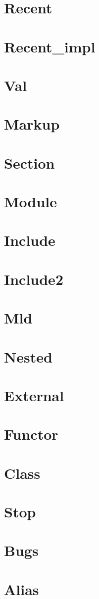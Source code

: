\documentclass{book}
\newcommand{\inputchapter}[1]{\chapter{#1}
    }
\begin{document}
\inputchapter{Recent}
\inputchapter{Recent_impl}
\inputchapter{Val}
\inputchapter{Markup}
\inputchapter{Section}
\inputchapter{Module}
\inputchapter{Include}
\inputchapter{Include2}
\inputchapter{Mld}
\inputchapter{Nested}
\inputchapter{External}
\inputchapter{Functor}
\inputchapter{Class}
\inputchapter{Stop}
\inputchapter{Bugs}
\inputchapter{Alias}
\end{document}
